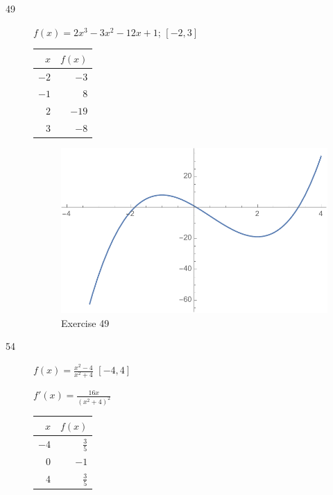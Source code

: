 \documentclass[letterpaper, landscape]{exam}
\begin{document}
  \begin{description}

    \item[49] $f(x) = 2x^3 - 3x^2 -12x + 1$; $[-2, 3]$
      \begin{solution}
        \begin{tabular}[H]{rr}
          \toprule
          $x$ & $f(x)$ \\
          \midrule
          $-2$  & $-3$ \\
          $-1$  & $8$ \\
          $2$   & $-19$ \\
          $3$   & $-8$ \\
          \bottomrule
        \end{tabular}
      \end{solution}

      \begin{figure}[H]
        \centering
        \includegraphics[scale = 0.6]{ex41_49.pdf}
        \caption{Exercise 49}
        \label{fig:ex41_49}
      \end{figure}

    \item[54]
      $f(x) = \frac{x^2 - 4}{x^2 + 4}$ $[-4, 4]$

      \begin{solution}
        $f'(x) = \frac{16x}{\left(x^2 + 4\right)^2}$

        \begin{tabular}[H]{rr}
          \toprule
          $x$  & $f(x)$ \\
          \midrule
          $-4$ & $\frac{3}{5}$ \\
          $0$  & $-1$ \\
          $4$  & $\frac{3}{5}$ \\
          \bottomrule
        \end{tabular}


\end{solution}
\end{description}
\end{document}
